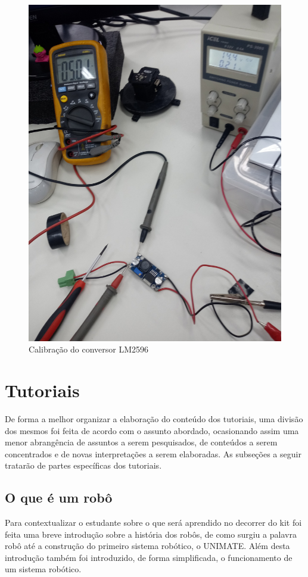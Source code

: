     \begin{figure}[H]
    	\centering
    	\includegraphics[scale=0.4, angle=0]{Figures/conversor2.jpg}
    	\caption{Calibração do conversor LM2596}
    	\label{fig:con2}
    \end{figure}
    
\section{Tutoriais}
De forma a melhor organizar a elaboração do conteúdo dos tutoriais, uma divisão dos mesmos foi feita de acordo com o assunto abordado, ocasionando assim uma menor abrangência de assuntos a serem pesquisados, de conteúdos a serem concentrados e de novas interpretações a serem elaboradas. As subseções a seguir tratarão de partes específicas dos tutoriais.

\subsection{O que é um robô}
Para contextualizar o estudante sobre o que será aprendido no decorrer do kit foi feita uma breve introdução sobre a história dos robôs, de como surgiu a palavra robô até a construção do primeiro sistema robótico, o UNIMATE. Além desta introdução também foi introduzido, de forma simplificada, o funcionamento de um sistema robótico.

